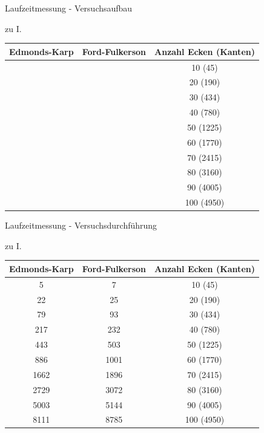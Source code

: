 \documentclass{beamer}
\begin{document}
    \begin{frame}{Laufzeitmessung - Versuchsaufbau}
        \begin{block}{zu I.}
            \begin{center}
                \begin{tabular}{c|c|c}
                    \textbf{Edmonds-Karp} & \textbf{Ford-Fulkerson} & Anzahl Ecken (Kanten)\\
                    \hline
                    & & 10 (45)\\
                    & & 20 (190)\\
                    & & 30 (434)\\
                    & & 40 (780)\\
                    & & 50 (1225)\\
                    & & 60 (1770)\\
                    & & 70 (2415)\\
                    & & 80 (3160)\\
                    & & 90 (4005)\\
                    & & 100 (4950)\\
                \end{tabular}
            \end{center}
        \end{block}
    \end{frame}

    \begin{frame}{Laufzeitmessung - Versuchsdurchf\"uhrung}
        \begin{block}{zu I.}
            \begin{center}
                \begin{tabular}{c|c|c}
                    \textbf{Edmonds-Karp} & \textbf{Ford-Fulkerson} & Anzahl Ecken (Kanten)\\
                    \hline
                    5 & 7 & 10 (45)\\
                    22 & 25 & 20 (190)\\
                    79 & 93 & 30 (434)\\
                    217 & 232 & 40 (780)\\
                    443 & 503 & 50 (1225)\\
                    886 & 1001 & 60 (1770)\\
                    1662 & 1896 & 70 (2415)\\
                    2729 & 3072 & 80 (3160)\\
                    5003 & 5144 & 90 (4005)\\
                    8111 & 8785 & 100 (4950)\\
                \end{tabular}
            \end{center}
        \end{block}
    \end{frame}
\end{document}
